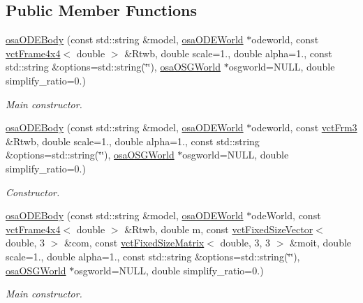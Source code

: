 \subsection*{Public Member Functions}
\begin{DoxyCompactItemize}
\item 
\hyperlink{classosa_o_d_e_body_a80ecbd3ff62439edbd5d889975637db0}{osa\+O\+D\+E\+Body} (const std\+::string \&model, \hyperlink{classosa_o_d_e_world}{osa\+O\+D\+E\+World} $\ast$odeworld, const \hyperlink{classvct_frame4x4}{vct\+Frame4x4}$<$ double $>$ \&Rtwb, double scale=1., double alpha=1., const std\+::string \&options=std\+::string(\char`\"{}\char`\"{}), \hyperlink{classosa_o_s_g_world}{osa\+O\+S\+G\+World} $\ast$osgworld=N\+U\+L\+L, double simplify\+\_\+ratio=0.)
\begin{DoxyCompactList}\small\item\em Main constructor. \end{DoxyCompactList}\item 
\hyperlink{classosa_o_d_e_body_ac4b5693d1f91faa9690659f79c4a607c}{osa\+O\+D\+E\+Body} (const std\+::string \&model, \hyperlink{classosa_o_d_e_world}{osa\+O\+D\+E\+World} $\ast$odeworld, const \hyperlink{vct_transformation_types_8h_a81feda0a02c2d1bc26e5553f409fed20}{vct\+Frm3} \&Rtwb, double scale=1., double alpha=1., const std\+::string \&options=std\+::string(\char`\"{}\char`\"{}), \hyperlink{classosa_o_s_g_world}{osa\+O\+S\+G\+World} $\ast$osgworld=N\+U\+L\+L, double simplify\+\_\+ratio=0.)
\begin{DoxyCompactList}\small\item\em Constructor. \end{DoxyCompactList}\item 
\hyperlink{classosa_o_d_e_body_a7a841b5bf9c7aeb447dd84670e2dadb8}{osa\+O\+D\+E\+Body} (const std\+::string \&model, \hyperlink{classosa_o_d_e_world}{osa\+O\+D\+E\+World} $\ast$ode\+World, const \hyperlink{classvct_frame4x4}{vct\+Frame4x4}$<$ double $>$ \&Rtwb, double m, const \hyperlink{classvct_fixed_size_vector}{vct\+Fixed\+Size\+Vector}$<$ double, 3 $>$ \&com, const \hyperlink{classvct_fixed_size_matrix}{vct\+Fixed\+Size\+Matrix}$<$ double, 3, 3 $>$ \&moit, double scale=1., double alpha=1., const std\+::string \&options=std\+::string(\char`\"{}\char`\"{}), \hyperlink{classosa_o_s_g_world}{osa\+O\+S\+G\+World} $\ast$osgworld=N\+U\+L\+L, double simplify\+\_\+ratio=0.)
\begin{DoxyCompactList}\small\item\em Main constructor. \end{DoxyCompactList}\item 

\end{DoxyCompactItemize}
